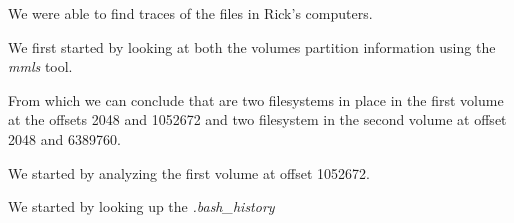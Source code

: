 We were able to find traces of the files in Rick's computers.

We first started by looking at both the volumes partition information using the \textit{mmls} tool.

\lstset{breaklines=true,basicstyle=\ttfamily\scriptsize,linewidth=12cm}





From which we can conclude that are two filesystems in place in the first volume at the offsets 2048 and 1052672 and two filesystem in the second volume at offset 2048 and 6389760.

We started by analyzing the first volume at offset 1052672.







We started by looking up the \textit{.bash\_history}